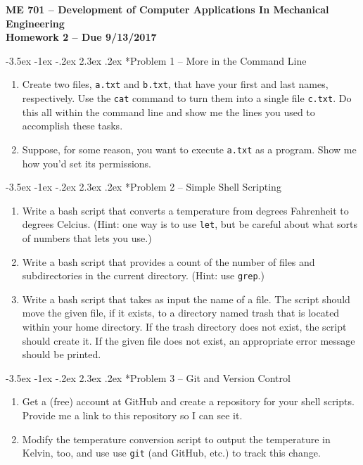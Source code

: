\documentclass[11pt]{article}
\makeatletter
\renewcommand\section{\@startsection{section}{1}{\z@}%
                                  {-3.5ex \@plus -1ex \@minus -.2ex}%
                                  {2.3ex \@plus.2ex}%
                                  {\normalfont\bfseries}}
\makeatother
\begin{document}
{\large
  \begin{center}
    {\bf ME 701 -- Development of Computer Applications In Mechanical Engineering \\ 
         Homework 2 -- Due 9/13/2017}         
    
  \end{center}
}
 

\section*{Problem 1 -- More in the Command Line}

\begin{enumerate}
\item Create two files, {\tt a.txt} and {\tt b.txt}, that have your 
      first and last names, respectively.  Use the {\tt cat} command 
      to turn them into a single file {\tt c.txt}.  Do this all within
      the command line and show me the lines you used to accomplish these
      tasks.
\item Suppose, for some reason, you want to execute {\tt a.txt} as a program.
      Show me how you'd set its permissions. 
\end{enumerate} 

\section*{Problem 2 -- Simple Shell Scripting}
 
\begin{enumerate}
\item Write a bash script that converts a temperature from degrees 
      Fahrenheit to degrees Celcius. (Hint: one way is to use {\tt let},
      but be careful about what sorts of numbers that lets you use.)
\item Write a bash script that provides a count of the number of files 
      and subdirectories in the current directory. (Hint: use {\tt grep}.)
\item Write a bash script that takes as input the name of a
      file. The script should move the given file, if it exists, to a 
      directory named trash that is located within 
      your home directory. If the trash directory does not exist, the script 
      should create it. If the given file does not exist, an appropriate 
      error message should be printed. 
\end{enumerate}

\section*{Problem 3 -- Git and Version Control}

\begin{enumerate}
 \item Get a (free) account at GitHub  and create a 
       repository for your shell scripts.  
       Provide me a link to this repository so I can see it.
 \item Modify the temperature conversion script to output the 
       temperature in Kelvin, too, and use 
       use {\tt git} (and GitHub, etc.) to track this change.
\end{enumerate}
 
\end{document}
